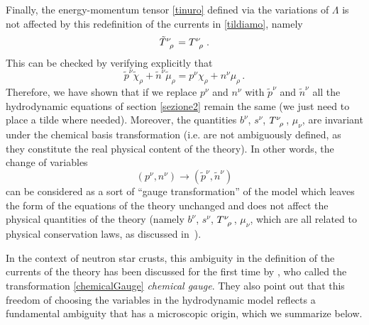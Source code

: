 \documentclass[preprints,article,accept,moreauthors,pdftex]{mdpi}
\begin{document}
Finally, the energy-momentum tensor \eqref{tinuro} defined via the variations of $\Lambda$ is not affected by this redefinition of the currents in \eqref{tildiamo}, namely
\begin{equation}
\tilde{T}\indices{^\nu _\rho} = T\indices{^\nu _\rho} \, .
\end{equation} 
This can be  checked by verifying explicitly that
\begin{equation}
\tilde{p}^\nu \tilde{\chi}_\rho +\tilde{n}^\nu \tilde{\mu}_\rho = p^\nu \chi_\rho + n^\nu \mu_\rho \, .
\end{equation} 
Therefore, we have shown that if we replace $p^\nu$ and $n^\nu$ with $\tilde{p}^\nu$ and $\tilde{n}^\nu$ all the hydrodynamic equations of section \ref{sezione2} remain the same (we just need to place a tilde where needed). Moreover, the quantities $b^\nu$, $s^\nu$, $T\indices{^\nu _\rho}$, $\mu_\nu$, are  invariant under the chemical basis transformation (i.e. are not ambiguously defined, as they constitute the real physical content of the theory). 
In other words, the change of variables
\begin{equation}
\label{chemicalGauge}
(p^\nu,n^\nu)  \longrightarrow (\tilde{p}^\nu,\tilde{n}^\nu)
\end{equation}
can be considered as a sort of ``gauge transformation'' of the model which leaves the form of the equations of the theory unchanged and does not affect the physical quantities of the theory (namely 
$b^\nu$, $s^\nu$, $T\indices{^\nu _\rho}$, $\mu_\nu$, which are all related to physical conservation laws, as discussed in~\citet{Termo}).  

In the context of neutron star crusts, this ambiguity in the definition of the currents of the theory  has been discussed for the first time by \citet{carter_macro_2006}, who called the transformation \eqref{chemicalGauge} \textit{chemical gauge}. They also point out that this freedom of choosing the variables in the hydrodynamic model reflects a fundamental ambiguity that has a microscopic origin, which we summarize below. 
\end{document}

